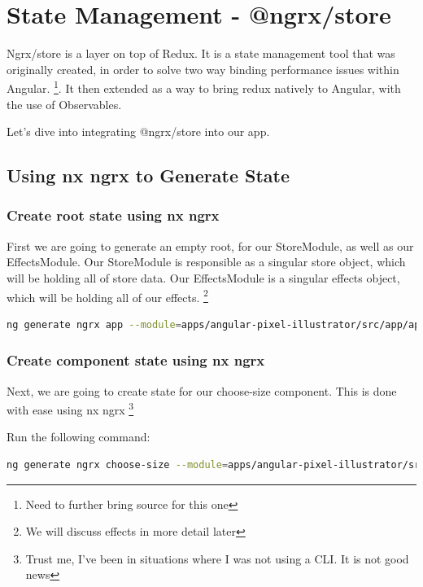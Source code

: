 
\section{ State Management - @ngrx/store }

Ngrx/store is a layer on top of Redux. It is a state management tool that was
originally created, in order to solve two way binding performance issues within
Angular. \footnote{Need to further bring source for this one}. It then extended
as a way to bring redux natively to Angular, with the use of Observables.

Let's dive into integrating @ngrx/store into our app. 

\subsection{ Using nx ngrx to Generate State }

\subsubsection{ Create root state using nx ngrx }

First we are going to generate an empty root, for our StoreModule, as well as
our EffectsModule. Our StoreModule is responsible as a singular store object,
which will be holding all of store data. Our EffectsModule is a singular effects
object, which will be holding all of our effects. \footnote{We will discuss
effects in more detail later}

\begin{lstlisting}[language=Bash]
ng generate ngrx app --module=apps/angular-pixel-illustrator/src/app/app.module.ts --onlyEmptyRoot
\end{lstlisting}

\subsubsection{ Create component state using nx ngrx }

Next, we are going to create state for our choose-size component. This is done
with ease using nx ngrx \footnote{Trust me, I've been in situations where I
was not using a CLI. It is not good news}

Run the following command:
\begin{lstlisting}[language=Bash]
ng generate ngrx choose-size --module=apps/angular-pixel-illustrator/src/app/components/choose-size/choose-size.module.ts
\end{lstlisting}

